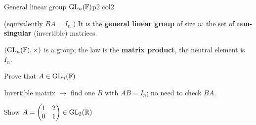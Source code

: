 \documentclass[course,noautoquant,noautokw]{neyvia-study}
\begin{document}
\begin{concept}[1.50]{General linear group $\mathrm{GL}_n(\mathbb{F})$}{p2 col2}
\begin{definition}
\par\noindent (equivalently $BA=I_n$.) It is the \textbf{general linear group} of size $n$: the set of \textbf{non-singular} (invertible) matrices.
\par\noindent $(\mathrm{GL}_n(\mathbb{F}),\times)$ is a group; the law is the \textbf{matrix product}, the neutral element is $I_n$.
\end{definition}
\begin{method}{Prove that $A\in\mathrm{GL}_n(\mathbb{F})$}
\end{method}
\begin{reflex}
Invertible matrix \ensuremath{\rightarrow} find one $B$ with $AB=I_n$; no need to check $BA$.
\end{reflex}
\begin{worked}{Show $A=\begin{pmatrix}1&2\\0&1\end{pmatrix}\in\mathrm{GL}_2(\mathbb{R})$}
\end{worked}
\begin{traps}
\end{traps}
\end{concept}
\end{document}
